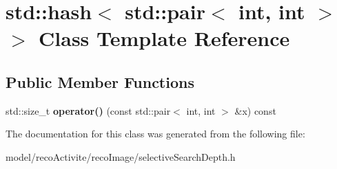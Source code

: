 \section{std\+:\+:hash$<$ std\+:\+:pair$<$ int, int $>$ $>$ Class Template Reference}
\label{classstd_1_1hash_3_01std_1_1pair_3_01int_00_01int_01_4_01_4}
\subsection*{Public Member Functions}
\begin{DoxyCompactItemize}
\item 
\mbox{\label{classstd_1_1hash_3_01std_1_1pair_3_01int_00_01int_01_4_01_4_ac8aa39f44d328e408d62466330d10df3}} 
std\+::size\+\_\+t {\bfseries operator()} (const std\+::pair$<$ int, int $>$ \&x) const
\end{DoxyCompactItemize}


The documentation for this class was generated from the following file\+:\begin{DoxyCompactItemize}
\item 
model/reco\+Activite/reco\+Image/selective\+Search\+Depth.\+h\end{DoxyCompactItemize}
